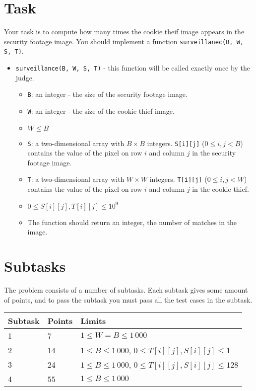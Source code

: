 \section*{Task}
Your task is to compute how many times the cookie theif image appears in the security footage image.
You should implement a function \texttt{surveillanec(B, W, S, T)}.
\begin{itemize}
  \item \texttt{surveillance(B, W, S, T)} - this function will be called exactly once by the judge.
  \begin{itemize}
    \item \texttt{B}: an integer - the size of the security footage image.
    \item \texttt{W}: an integer - the size of the cookie thief image.
    \item $W \le B$
    \item \texttt{S}: a two-dimensional array with $B \times B$ integers. \texttt{S[i][j]} ($0 \le i, j < B$) contains the value of the pixel on row $i$ and column $j$ in the security footage image.
    \item \texttt{T}: a two-dimensional array with $W \times W$ integers. \texttt{T[i][j]} ($0 \le i, j < W$) contains the value of the pixel on row $i$ and column $j$ in the cookie thief.
    \item $0 \le S[i][j], T[i][j] \le 10^9$
    \item The function should return an integer, the number of matches in the image.
  \end{itemize}
\end{itemize}

\section*{Subtasks}
The problem consists of a number of subtasks. Each subtask gives some amount of points, and to pass
the subtask you must pass all the test cases in the subtask.

\begin{tabular}{|l|l|l|}
  \hline
  \textbf{Subtask} & \textbf{Points} & \textbf{Limits} \\ \hline
  1 & 7 & $1 \le W = B \le 1\,000$  \\ \hline

  2 & 14 & $1 \le B \le 1\,000$, $0 \le T[i][j], S[i][j] \le 1$ \\ \hline

  3 & 24 & $1 \le B \le 1\,000$, $0 \le T[i][j], S[i][j] \le 128$ \\ \hline

  4 & 55 & $1 \le B \le 1\,000$ \\ \hline

\end{tabular}

